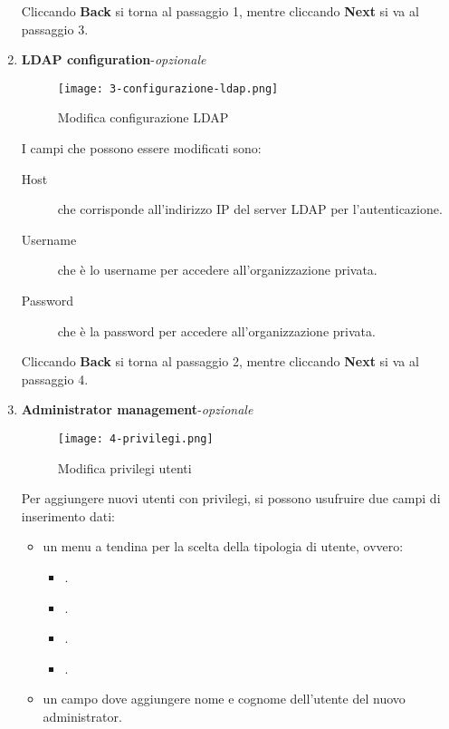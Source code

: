 \documentclass[../manuale-utente.tex]{subfiles}
\begin{document}
\begin{enumerate}
    Cliccando \textbf{Back} si torna al passaggio 1, mentre cliccando \textbf{Next} si va al passaggio 3.

    \item \textbf{LDAP configuration}-\textit{opzionale}

    \begin{figure}[H]
        \centering
        \texttt{[image: 3-configurazione-ldap.png]}
        \caption{Modifica configurazione LDAP}%
        \label{fig:web_app_modifica_configurazione_ldap}
    \end{figure}

    I campi che possono essere modificati sono:
    \begin{description}
        \item[Host] che corrisponde all'indirizzo IP del server LDAP per l'autenticazione.
        \item[Username] che è lo username per accedere all'organizzazione privata.
        \item[Password] che è la password per accedere all'organizzazione privata.
    \end{description}

    Cliccando \textbf{Back} si torna al passaggio 2, mentre cliccando \textbf{Next} si va al passaggio 4.

    \newpage
    \item \textbf{Administrator management}-\textit{opzionale}

    \begin{figure}[H]
        \centering
        \texttt{[image: 4-privilegi.png]}
        \caption{Modifica privilegi utenti}%
        \label{fig:web_app_modifica_privilegi_utenti}
    \end{figure}

    Per aggiungere nuovi utenti con privilegi, si possono usufruire due campi di inserimento dati:
    \begin{itemize}
        \item un menu a tendina per la scelta della tipologia di utente, ovvero:
        \begin{itemize}
            \item {}.
            \item {}.
            \item {}.
            \item {}.
        \end{itemize}
        \item un campo dove aggiungere nome e cognome dell'utente del nuovo administrator.
    \end{itemize}


\end{enumerate}
\end{document}
